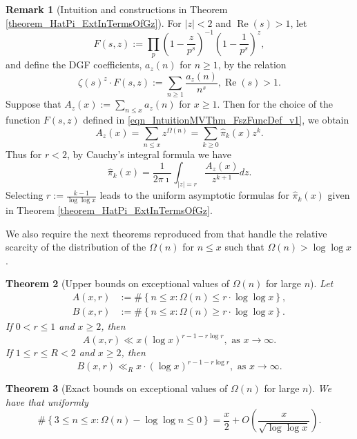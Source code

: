 \documentclass[11pt,reqno,a4letter]{article}
\numberwithin{figure}{section}
\numberwithin{table}{section}
\theoremstyle{plain}
\newtheorem{theorem}{Theorem}
\numberwithin{theorem}{section}
\theoremstyle{definition}
\newtheorem{remark}[theorem]{Remark}
\renewcommand{\Re}{\operatorname{Re}}
\begin{document}
\begin{remark}[Intuition and constructions in Theorem \ref{theorem_HatPi_ExtInTermsOfGz}] 
\label{remark_intuitionConstrIn_theorem_HatPi_ExtInTermsOfGz} 
For $|z| < 2$ and $\Re(s) > 1$, let 
\begin{equation} 
\label{eqn_IntuitionMVThm_FszFuncDef_v1} 
F(s, z) := \prod_{p} \left(1 - \frac{z}{p^s}\right)^{-1} \left(1 - \frac{1}{p^s}\right)^{z}, 
\end{equation} 
and define the DGF coefficients, $a_z(n)$ for $n \geq 1$, by the relation 
\[
\zeta(s)^{z} \cdot F(s, z) := \sum_{n \geq 1} \frac{a_z(n)}{n^s}, \Re(s) > 1. 
\]
Suppose that $A_z(x) := \sum_{n \leq x} a_z(n)$ for $x \geq 1$. Then for the choice of the 
function $F(s, z)$ defined in \eqref{eqn_IntuitionMVThm_FszFuncDef_v1}, we obtain 
\[
A_z(x) = \sum_{n \leq x} z^{\Omega(n)} = \sum_{k \geq 0} \widehat{\pi}_k(x) z^k. 
\]
Thus for $r < 2$, by Cauchy's integral formula we have 
\[
\widehat{\pi}_k(x) = \frac{1}{2\pi\imath} \int_{|z|=r} \frac{A_z(x)}{z^{k+1}} dz. 
\]
Selecting $r := \frac{k-1}{\log\log x}$ leads to the uniform asymptotic formulas for 
$\widehat{\pi}_k(x)$ given in 
Theorem \ref{theorem_HatPi_ExtInTermsOfGz}. 
\end{remark} 

We also require the next theorems reproduced from \cite[\S 7.4]{MV} that handle the relative 
scarcity of the distribution of the $\Omega(n)$ for $n \leq x$ such that 
$\Omega(n) > \log\log x$. 

\begin{theorem}[Upper bounds on exceptional values of $\Omega(n)$ for large $n$] 
\label{theorem_MV_Thm7.20-init_stmt} 
Let 
\begin{align*} 
A(x, r) & := \#\left\{n \leq x: \Omega(n) \leq r \cdot \log\log x\right\}, \\ 
B(x, r) & := \#\left\{n \leq x: \Omega(n) \geq r \cdot \log\log x\right\}. 
\end{align*} 
If $0 < r \leq 1$ and $x \geq 2$, then 
\[
A(x, r) \ll x (\log x)^{r-1 - r\log r}, \text{ \ as\ } x \rightarrow \infty. 
\]
If $1 \leq r \leq R < 2$ and $x \geq 2$, then 
\[
B(x, r) \ll_R x \cdot (\log x)^{r-1-r \log r}, \text{ \ as\ } x \rightarrow \infty. 
\]
\end{theorem} 

\begin{theorem}[Exact bounds on exceptional values of $\Omega(n)$ for large $n$] 
\label{theorem_MV_Thm7.21-init_stmt} 
We have that uniformly 
\[
\#\left\{3 \leq n \leq x: \Omega(n) - \log\log n \leq 0\right\} = 
     \frac{x}{2} + O\left(\frac{x}{\sqrt{\log\log x}}\right). 
\]
\end{theorem} 
\end{document}
